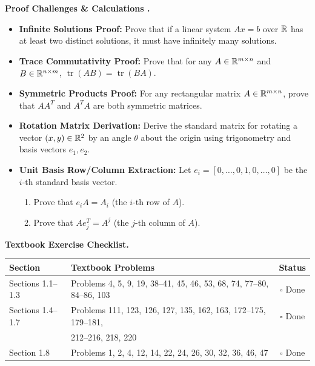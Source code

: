 \documentclass{natsirt}
\newcounter{topic}[section]
\newenvironment{challengebox}[1][]{%
    \begin{redbox}[#1]\refstepcounter{topic}\textbf{Proof Challenges \& Calculations \thesection.\thetopic}%
}{\end{redbox}}
\newenvironment{reviewbox}[1][]{\begin{whitebox}[#1]\textbf{Textbook Exercise Checklist. }}{\end{whitebox}}
\newcommand{\citem}{\item[$\square$]}
\newcommand{\tr}{\operatorname{tr}}
\begin{document}
\begin{challengebox}
    \begin{itemize}
        \citem \textbf{Infinite Solutions Proof:} Prove that if a linear system $Ax = b$ over $\mathbb{R}$ has at least two distinct solutions, it must have infinitely many solutions.
        \citem \textbf{Trace Commutativity Proof:} Prove that for any $A \in \mathbb{R}^{m \times n}$ and $B \in \mathbb{R}^{n \times m}$, $\tr(AB) = \tr(BA)$.
        \citem \textbf{Symmetric Products Proof:} For any rectangular matrix $A \in \mathbb{R}^{m \times n}$, prove that $A A^T$ and $A^T A$ are both symmetric matrices.
        \citem \textbf{Rotation Matrix Derivation:} Derive the standard matrix for rotating a vector $(x, y) \in \mathbb{R}^2$ by an angle $\theta$ about the origin using trigonometry and basis vectors $e_1, e_2$.
        \citem \textbf{Unit Basis Row/Column Extraction:} Let $e_i = [0, \dots, 0, 1, 0, \dots, 0]$ be the $i$-th standard basis vector.
        \begin{enumerate}
            \item Prove that $e_i A = A_i$ (the $i$-th row of $A$).
            \item Prove that $A e_j^T = A^j$ (the $j$-th column of $A$).
        \end{enumerate}
    \end{itemize}
\end{challengebox}

\begin{reviewbox}
    \begin{center}
    \begin{tabular}{|l|l|c|}
        \hline
        \textbf{Section} & \textbf{Textbook Problems} & \textbf{Status} \\
        \hline
        Sections 1.1--1.3 & Problems 4, 5, 9, 19, 38--41, 45, 46, 53, 68, 74, 77--80, 84--86, 103 & $\square$ Done \\
        Sections 1.4--1.7 & Problems 111, 123, 126, 127, 135, 162, 163, 172--175, 179--181, & $\square$ Done \\
                         & 212--216, 218, 220 & \\
        Section 1.8       & Problems 1, 2, 4, 12, 14, 22, 24, 26, 30, 32, 36, 46, 47 & $\square$ Done \\
        \hline
    \end{tabular}
    \end{center}
\end{reviewbox}


\end{document}
